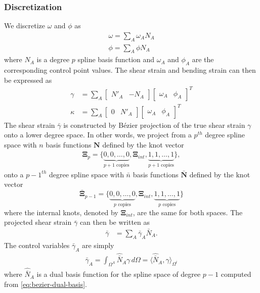 \subsubsection{Discretization}
We discretize $\omega$ and $\phi$ as
\begin{align}
    {\omega = \sum_A \omega_A N_A} \\
    {\phi = \sum_A \phi N_A}
\end{align}
where $N_A$ is a degree $p$ spline basis function and $\omega_A$ and $\phi_A$ are the corresponding control point values. The shear strain and bending strain can then be expressed as
\begin{align}
    \gamma & = \sum_A{\begin{bmatrix}N'_A & -N_A\end{bmatrix}\begin{bmatrix}\omega_A & \phi_A\end{bmatrix}^T} \\
    \kappa & = \sum_A\begin{bmatrix}0 & N'_A\end{bmatrix}\begin{bmatrix}\omega_A & \phi_A\end{bmatrix}^T
\end{align}
The shear strain $\bar{\gamma}$ is constructed by B\'{e}zier projection of the true shear strain $\gamma$ onto a lower degree space. In other words, we project from a $p^{th}$ degree spline space with $n$ basis functions $\mathbf{N}$ defined by the knot vector
\begin{align}
    \mathbf{\Xi}_{p}=\lbrace{\underbrace{0,0,\ldots,0}_\text{$p+1$ copies}},\mathbf{\Xi}_{int},{\underbrace{1,1,\ldots,1}_\text{$p+1$ copies}}\rbrace,
    \label{eq:origin_knot_vector}
\end{align}
onto a $p-1^{th}$ degree spline space with $\bar{n}$ basis functions $\bar{\mathbf{N}}$ defined by the knot vector
\begin{equation}
    \bar{\mathbf{\Xi}}_{p-1}=\lbrace{\underbrace{0,0,\ldots,0}_\text{$p$ copies}},\mathbf{\Xi}_{int},{\underbrace{1,1,\ldots,1}_\text{$p$ copies}}\rbrace
    \label{eq:projected_knot_vector}
\end{equation}
where the internal knots, denoted by $\mathbf{\Xi}_{int}$, are the same for both spaces. The projected shear strain $\bar{\gamma}$ can then be written as
\begin{align}
    \bar{\gamma} & = \sum_A \bar{\gamma}_A \bar{N}_A.
\end{align}
The control variables $\bar{\gamma}_A$ are simply
\begin{align}
    \bar{\gamma}_A = \int_{\Omega^A} \hat{\bar{N}}_A \gamma \, d\Omega = \langle \hat{\bar{N}}_A, \gamma \rangle_{\Omega^i}
\end{align}
where $\hat{\bar{N}}_A$ is a dual basis function for the spline space of degree $p-1$ computed from \eqref{eq:bezier-dual-basis}.

